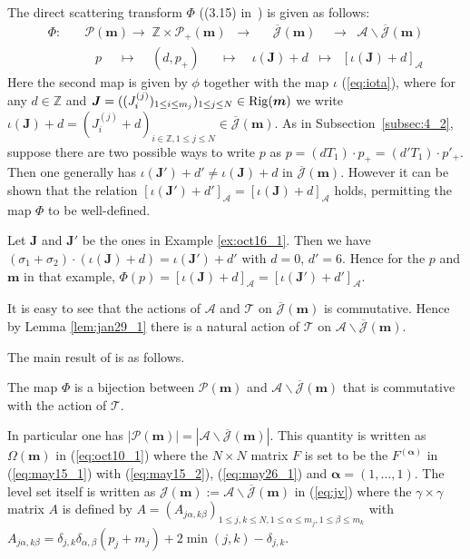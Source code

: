 \documentclass[pdftex]{sigma}
\newcommand{\Z}{{\mathbb Z}}
\newcommand{\J}{{\mathcal J}}
\newcommand{\Jb}{{\overline{\mathcal J}}}
\newcommand{\Rig}{{\rm Rig}}
\newcommand{\Pth}{{\mathcal P}}
\newcommand\boa{\boldsymbol{\alpha}}
\newcommand{\m}{{\boldsymbol m}}
\newcommand{\boJ}{{\boldsymbol J}}
\begin{document}
The direct scattering transform $\Phi$ ((3.15) in~\cite{KTT}) is given as follows:
\begin{equation}\label{eq:pj}
\begin{split}
\Phi: \quad &\Pth(\m) \longrightarrow \;\Z \times \Pth_+(\m)\;\;
\longrightarrow \;\;\quad \Jb(\m) \;\;\;\;\longrightarrow
\;\; {{\mathcal A} \backslash \Jb (\m)}\\
&\;\;\;p \;\quad \longmapsto \;\;\;\;(d, p_+) \;\;\quad\longmapsto
\quad \iota(\boJ)+d \;\;\longmapsto \;\;[\iota(\boJ)+d]_{\mathcal A}
\end{split}
\end{equation}
Here the second map is given by $\phi$ together with the map $\iota$ {(\ref{eq:iota})}, where
for any $d \in \Z$ and $\boJ = ((J^{(j)}_i)_{1 \le i \le m_{j}})_{1 \leq j \leq N} \in \Rig(\m)$ we write
{$\iota (\boJ) + d = (J^{(j)}_i + d)_{i \in \Z, 1 \leq j \leq N} \in \Jb(\m)$}.
{As in Subsection~\ref{subsec:4_2},}
suppose there are two possible ways to write $p$ as  $p =(d T_1) \cdot p_+ = (d' T_1) \cdot p'_+$.
{Then one generally has $\iota(\boJ')+d' \ne \iota(\boJ)+d$ in $\Jb(\m)$.}
However it can be shown that the relation $[\iota(\boJ')+d']_{\mathcal A} = [\iota(\boJ)+d]_{\mathcal A}$
{holds}, permitting the map $\Phi$ to be well-def\/ined.
\begin{example}\label{ex:oct16_2}
Let $\boJ$ and $\boJ'$ be the ones in Example \ref{ex:oct16_1}.
Then we have
$(\sigma_1 + \sigma_2) \cdot (\iota (\boJ) + d) = \iota (\boJ') + d'$ with $d=0$, $d'=6$.
Hence for the $p$ and $\m$ in that example,
{$\Phi (p) = [\iota (\boJ) + d]_{\mathcal A} = [\iota (\boJ') + d']_{\mathcal A}$}.
\end{example}

It is easy to see that the actions of ${\mathcal A}$ and ${\mathcal T}$ on $\Jb(\m)$ is commutative.
Hence by Lemma \ref{lem:jan29_1} there is a natural action of ${\mathcal T}$ on ${\mathcal A} \backslash \Jb (\m)$.

The main result of \cite{KTT} is as follows.
\begin{proposition}\label{prop:ktt}
The map $\Phi$ is a bijection
between ${\mathcal P}(\m)$ and ${\mathcal A} \backslash \Jb (\m)$
that is commutative with the action of ${\mathcal T}$.
\end{proposition}


In particular one has $|{\mathcal P}(\m)| = |{\mathcal A} \backslash \Jb (\m)|$.
This quantity is written as $\Omega (\m)$ in (\ref{eq:oct10_1}) where the $N \times N$ matrix
$F$ is set to be the $F^{(\boa)}$ in (\ref{eq:may15_1}) with (\ref{eq:may15_2}), (\ref{eq:may26_1}) and
$\boa = (1,\ldots,1)$.
The level set itself is written as $\J (\m) {:= {\mathcal A} \backslash \Jb (\m)}$ in (\ref{eq:jv}) where the
$\gamma \times \gamma$ matrix $A$ is def\/ined by $A = (A_{j\alpha,k\beta})_{1 \leq j,k \leq N, 1 \leq \alpha \leq m_j, 1 \leq \beta \leq m_k}$
with
\begin{math}
A_{j\alpha,k\beta} = \delta_{j,k} \delta_{\alpha,\beta} (p_j + m_j) + 2 \min (j,k) - \delta_{j,k}.
\end{math}
\end{document}
